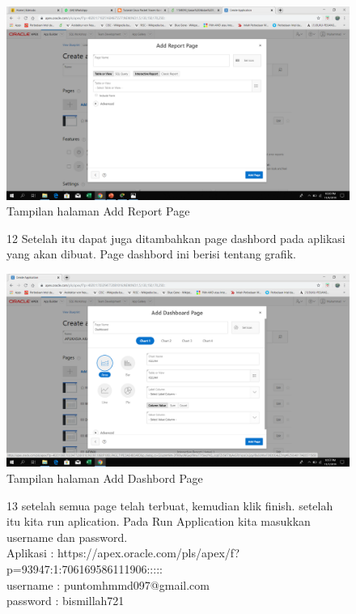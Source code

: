 \begin{enumerate}
\begin{figure}[!htbp]
    \begin{center}
    \includegraphics[scale=0.2]{figures/33.png}
     \caption{Tampilan halaman Add Report Page}
    \end{center}   
    \end{figure}
    
\begin{figure}[!htbp]
\item[12]Setelah itu dapat juga ditambahkan page dashbord pada aplikasi yang akan dibuat. Page dashbord ini berisi tentang grafik. 

    \begin{center}
    \includegraphics[scale=0.2]{figures/25.png}
     \caption{Tampilan halaman Add Dashbord Page}
    \end{center}   
    \end{figure}
 
\begin{figure}[!htbp]   
\item[13]setelah semua page telah terbuat, kemudian klik finish. setelah itu kita run aplication. Pada Run Application kita masukkan username dan password.\\
Aplikasi : https://apex.oracle.com/pls/apex/f?p=93947:1:706169586111906:::::\\
username : puntomhmmd097@gmail.com\\
password : bismillah721



\end{figure}
\end{enumerate}
